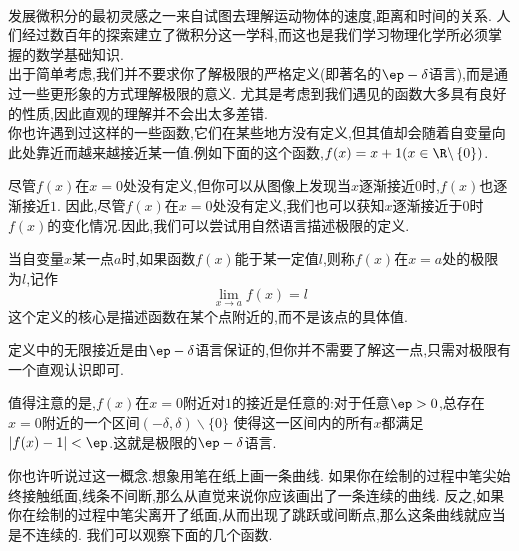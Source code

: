 \documentclass{ctexart}
\begin{document}
\pagestyle{plain}
\noindent{}\vspace{15pt}\\
\indent 发展微积分的最初灵感之一来自试图去理解运动物体的速度,距离和时间的关系.%
人们经过数百年的探索建立了微积分这一学科,而这也是我们学习物理化学所必须掌握的数学基础知识.\vspace{12pt}\\
\indent 出于简单考虑,我们并不要求你了解极限的严格定义(即著名的$\ep-\delta$语言),而是通过一些更形象的方式理解极限的意义.%
尤其是考虑到我们遇见的函数大多具有良好的性质,因此直观的理解并不会出太多差错.\\
\indent 你也许遇到过这样的一些函数,它们在某些地方没有定义,但其值却会随着自变量向此处靠近而越来越接近某一值.例如下面的这个函数,$f(x)=x+1(x\in\R\backslash\left\{0\right\})$.
\begin{tightcenter}
    
\end{tightcenter}

\indent 尽管$f(x)$在$x=0$处没有定义,但你可以从图像上发现当$x$逐渐接近$0$时,$f(x)$也逐渐接近$1$.%
因此,尽管$f(x)$在$x=0$处没有定义,我们也可以获知$x$逐渐接近于$0$时$f(x)$的变化情况.因此,我们可以尝试用自然语言描述极限的定义.
\begin{definition}[0A.1.1 函数极限]
    当自变量$x$某一点$a$时,如果函数$f(x)$能于某一定值$l$,则称$f(x)$在$x=a$处的极限为$l$,记作
    \[\lim_{x\to a}f(x)=l\]
    这个定义的核心是描述函数在某个点附近的,而不是该点的具体值.
\end{definition}
定义中的无限接近是由$\ep-\delta$语言保证的,但你并不需要了解这一点,只需对极限有一个直观认识即可.
\begin{hint}
    值得注意的是,$f(x)$在$x=0$附近对$1$的接近是任意的:对于任意$\ep>0$,总存在$x=0$附近的一个区间$(-\delta,\delta)\backslash\{0\}$%
    使得这一区间内的所有$x$都满足$\left|f(x)-1\right|<\ep$.这就是极限的$\ep-\delta$语言.
\end{hint}
\indent 你也许听说过这一概念.想象用笔在纸上画一条曲线.%
如果你在绘制的过程中笔尖始终接触纸面,线条不间断,那么从直觉来说你应该画出了一条连续的曲线.%
反之,如果你在绘制的过程中笔尖离开了纸面,从而出现了跳跃或间断点,那么这条曲线就应当是不连续的.%
我们可以观察下面的几个函数.
\begin{tightcenter}
    
\end{tightcenter}
\end{document}
